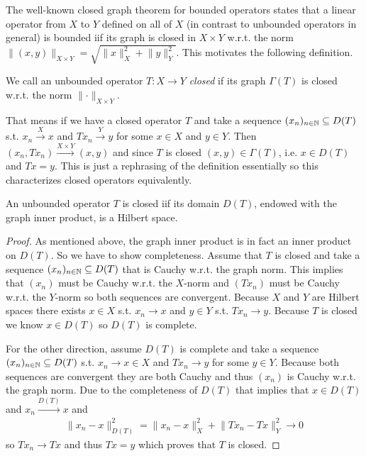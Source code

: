 \documentclass[../master_thesis.tex]{subfiles}
\begin{document}
The well-known closed graph theorem for bounded operators states that 
a linear operator from $X$ to $Y$ defined on all of $X$ 
(in contrast to unbounded operators in general) is bounded iif 
its graph is closed in $X\times Y$ w.r.t. the norm 
$\lVert (x,y) \rVert _{X\times Y} 
= \sqrt{\lVert x \rVert^2 _{X} + \lVert y \rVert^2 _{Y}}$. 
This motivates the following definition.

\begin{definition}
    We call an unbounded operator $T:X \rightarrow Y$ \textit{closed} if 
    its graph $\Gamma(T)$ is closed w.r.t. the norm 
    $\lVert \cdot \rVert _{X\times Y}$.
\end{definition}
That means if we have a closed operator $T$ and
take a sequence $(x_n)_{n\in \mathbb{N}} \subseteq D(T)$
s.t. $x_n \xrightarrow{X} x$ and $Tx_n \xrightarrow{Y} y$ for some 
$x \in X$ and $y \in Y$. Then $(x_n,Tx_n) \xrightarrow{X\times Y} (x,y)$ and 
since $T$ is closed
$(x,y) \in \Gamma(T)$, i.e. $x \in D(T)$ and $Tx = y$. This is just 
a rephrasing of the definition essentially so this characterizes closed
operators equivalently.

\begin{proposition}\label{prop:closed_operator_graph_norm}
    An unbounded operator $T$ is closed iif its domain $D(T)$, endowed with the 
    graph inner product, is a Hilbert space.
\end{proposition}
\begin{proof}
    As mentioned above, the graph inner product is in fact an inner product 
    on $D(T)$. So we have to show completeness.
    Assume that $T$ is closed and take a sequence $(x_n)_{n \in \mathbb{N}} 
    \subseteq D(T)$ that is Cauchy w.r.t. the graph norm. This implies 
    that $(x_n)$ must be Cauchy w.r.t. the $X$-norm and $(Tx_n)$ must be 
    Cauchy w.r.t. the $Y$-norm so both sequences are convergent. Because $X$ and $Y$ are Hilbert spaces 
    there exists $x \in X$ s.t. $x_n \rightarrow x$ and $y \in Y$ s.t. 
    $Tx_n \rightarrow y$. Because $T$ is closed we know 
    $x \in D(T)$ so $D(T)$ is complete.

    For the other direction, assume $D(T)$ is complete and take a sequence 
    $(x_n)_{n \in \mathbb{N}} \allowbreak\subseteq D(T)$ s.t. $x_n \rightarrow x \in X$ 
    and $Tx_n \rightarrow y$ for some $y \in Y$. Because both sequences are 
    convergent they are both Cauchy and thus $(x_n)$ is Cauchy w.r.t. the
    graph norm. Due to the completeness of $D(T)$ that implies that $x \in D(T)$
    and $x_n \xrightarrow{D(T)} x$ and 
    \begin{align*}
        \lVert x_n - x \rVert^2 _{D(T)} 
        = \lVert x_n - x \rVert^2 _X + \lVert Tx_n - Tx \rVert^2 _Y 
        \rightarrow 0
    \end{align*}
    so $T x_n \rightarrow T x$ and thus $Tx = y$ which proves that 
    $T$ is closed.
\end{proof}
\end{document}
